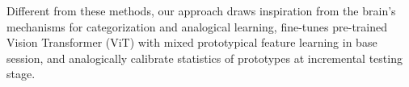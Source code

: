 Different from these methods, our approach draws inspiration from the brain's mechanisms for categorization and analogical learning, fine-tunes pre-trained Vision Transformer (ViT) with mixed prototypical feature learning in base session, and analogically calibrate statistics of prototypes at incremental testing stage.